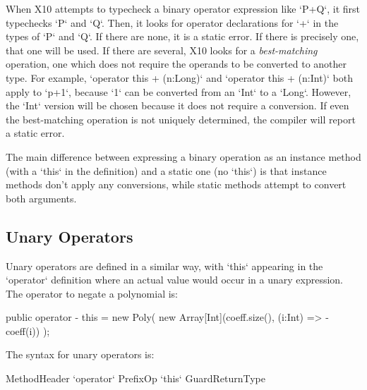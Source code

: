 When X10 attempts to typecheck a binary operator expression like \xcd`P+Q`, it
first typechecks \xcd`P` and \xcd`Q`. Then, it looks for operator declarations
for \xcd`+` in the types of \xcd`P` and \xcd`Q`. If there are none, it is a
static error. If there is precisely one, that one will be used. If there are
several, X10 looks for a {\em best-matching} operation, \viz{} one which does
not require the operands to be converted to another type. For example,
\xcd`operator this + (n:Long)` and \xcd`operator this + (n:Int)` both apply to
\xcd`p+1`, because \xcd`1` can be converted from an \xcd`Int` to a \xcd`Long`.
However, the \xcd`Int` version will be chosen because it does not require a
conversion. If even the best-matching operation is not uniquely determined,
the compiler will report a static error.

The main difference between expressing a binary operation as an instance
method (with a \xcd`this` in the definition) and a static one (no \xcd`this`)
is that instance methods don't apply any conversions, while static methods
attempt to convert both arguments. 


\subsection{Unary Operators}

Unary operators are defined in a similar way, with \xcd`this` appearing in the
\xcd`operator` definition where an actual value would occur in a unary
expression.  The operator to negate a polynomial is: 

\begin{xten}
  public operator - this = new Poly(
    new Array[Int](coeff.size(), (i:Int) => -coeff(i))
    );
\end{xten}

The syntax for unary operators is:

\begin{grammar}
MethodHeader \:
  \xcd`operator` PrefixOp \xcd`this`    Guard\opt ReturnType\opt  
\end{grammar}

